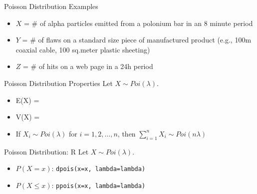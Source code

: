\documentclass[
  ignorenonframetext,
]{beamer}
\providecommand{\tightlist}{%
  \setlength{\itemsep}{0pt}\setlength{\parskip}{0pt}}
\begin{document}
\begin{frame}{Poisson Distribution Examples}
\protect{}\label{poisson-distribution-examples}
\begin{itemize}
\item
  \(X\) = \# of alpha particles emitted from a polonium bar in an 8
  minute period\\
\item
  \(Y\) = \# of flaws on a standard size piece of manufactured product
  (e.g., 100m coaxial cable, 100 sq.meter plastic sheeting)\\
\item
  \(Z\) = \# of hits on a web page in a 24h period
\end{itemize}
\end{frame}

\begin{frame}{Poisson Distribution Properties}
\protect{}\label{poisson-distribution-properties}
Let \(X\sim Poi(\lambda)\).

\begin{itemize}
\tightlist
\item
  E(X) =
\end{itemize}

\hfill\break
\hfill\break
\hfill\break

\begin{itemize}
\tightlist
\item
  V(X) =
\end{itemize}

\hfill\break
\hfill\break
\hfill\break

\begin{itemize}
\tightlist
\item
  If \(X_i\sim Poi(\lambda)\) for \(i=1,2,\dots,n\), then
  \(\sum_{i=1}^n X_i \sim Poi(n\lambda)\)
\end{itemize}
\end{frame}

\begin{frame}[fragile]{Poisson Distribution: R}
\protect{}\label{poisson-distribution-r}
Let \(X\sim Poi(\lambda)\).

\begin{itemize}
\tightlist
\item
  \(P(X = x)\): \texttt{dpois(x=x,\ lambda=lambda)}
\end{itemize}

\hfill\break
\hfill\break
\hfill\break

\begin{itemize}
\tightlist
\item
  \(P(X \leq x)\): \texttt{ppois(x=x,\ lambda=lambda)}
\end{itemize}
\end{frame}
\end{document}

